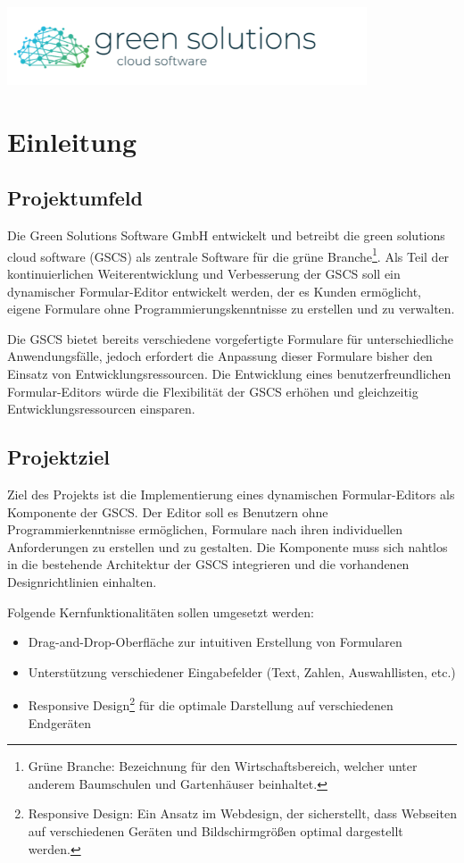 \documentclass[a4paper,11pt]{article}
\begin{document}
\begin{titlepage}
\begin{center}
\includegraphics[width=0.8\textwidth]{green_solutions_logo}
\end{center}
\end{titlepage}

\tableofcontents
\newpage


\section{Einleitung}
\subsection{Projektumfeld}
Die Green Solutions Software GmbH entwickelt und betreibt die green solutions cloud software (GSCS) als zentrale Software für die grüne Branche\footnote{Grüne Branche: Bezeichnung für den Wirtschaftsbereich, welcher unter anderem Baumschulen und Gartenhäuser beinhaltet.}. Als Teil der kontinuierlichen Weiterentwicklung und Verbesserung der GSCS soll ein dynamischer Formular-Editor entwickelt werden, der es Kunden ermöglicht, eigene Formulare ohne Programmierungskenntnisse zu erstellen und zu verwalten.

\noindent Die GSCS bietet bereits verschiedene vorgefertigte Formulare für unterschiedliche Anwendungsfälle, jedoch erfordert die Anpassung dieser Formulare bisher den Einsatz von Entwicklungsressourcen. Die Entwicklung eines benutzerfreundlichen Formular-Editors würde die Flexibilität der GSCS erhöhen und gleichzeitig Entwicklungsressourcen einsparen.

\subsection{Projektziel}
Ziel des Projekts ist die Implementierung eines dynamischen Formular-Editors als Komponente der GSCS. Der Editor soll es Benutzern ohne Programmierkenntnisse ermöglichen, Formulare nach ihren individuellen Anforderungen zu erstellen und zu gestalten. Die Komponente muss sich nahtlos in die bestehende Architektur der GSCS integrieren und die vorhandenen Designrichtlinien einhalten.

Folgende Kernfunktionalitäten sollen umgesetzt werden:
\begin{itemize}
  \item Drag-and-Drop-Oberfläche zur intuitiven Erstellung von Formularen
  \item Unterstützung verschiedener Eingabefelder (Text, Zahlen, Auswahllisten, etc.)
  \item Responsive Design\footnote{Responsive Design: Ein Ansatz im Webdesign, der sicherstellt, dass Webseiten auf verschiedenen Geräten und Bildschirmgrößen optimal dargestellt werden.} für die optimale Darstellung auf verschiedenen Endgeräten
\end{itemize}
\end{document}

